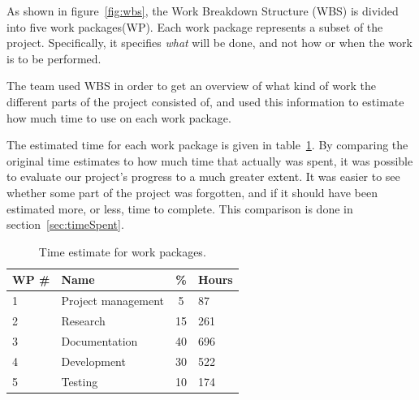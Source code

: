 As shown in figure~\ref{fig:wbs}, the Work Breakdown Structure (WBS) is divided into five work packages(WP). Each work package represents a subset of the project. Specifically, it specifies \emph{what} will be done, and not how or when the work is to be performed.

The team used WBS in order to get an overview of what kind of work the different parts of the project consisted of, and used this information to estimate how much time to use on each work package.

The estimated time for each work package is given in table~\ref{tab:timeEstWP}. By comparing the original time estimates to how much time that actually was spent, it was possible to evaluate our project's progress to a much greater extent. It was easier to see whether some part of the project was forgotten, and if it should have been estimated more, or less, time to complete. This comparison is done in section~\ref{sec:timeSpent}.

\begin{table}[H]
\centering
{}
\begin{tabular}{|l|l|c|l|}
\hline
    \textbf{WP \#} & \textbf{Name} & \textbf{\%} & \textbf{Hours} \\\hline
    1 & Project management & 5 & 87\\\hline
    2 & Research		   & 15 & 261\\\hline
    3 & Documentation	   & 40 & 696\\\hline
    4 & Development 	   & 30 & 522\\\hline
    5 & Testing  		   & 10 & 174\\\hline
\end{tabular}
\caption{Time estimate for work packages.}
\label{tab:timeEstWP}
\end{table}